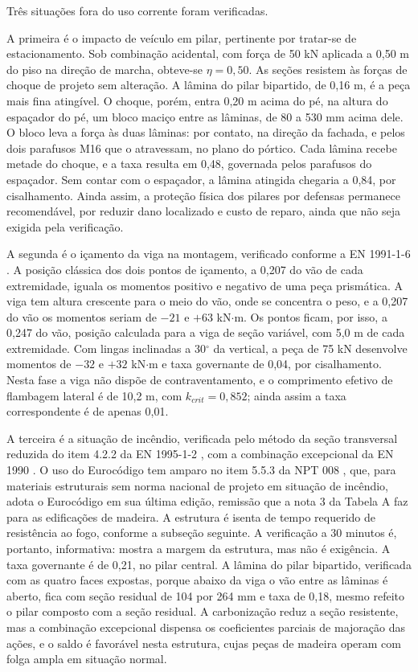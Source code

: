 Três situações fora do uso corrente foram verificadas.

A primeira é o impacto de veículo em pilar, pertinente por tratar-se de
estacionamento. Sob combinação acidental, com força de 50 kN aplicada a 0,50 m
do piso na direção de marcha, obteve-se $\eta = 0{,}50$. As seções resistem às
forças de choque de projeto sem alteração. A lâmina do pilar bipartido, de
0,16 m, é a peça mais fina atingível. O choque, porém, entra 0,20 m acima do pé,
na altura do espaçador do pé, um bloco maciço entre as lâminas, de 80 a 530 mm acima
dele. O bloco leva a força às duas lâminas: por contato, na direção da fachada, e
pelos dois parafusos M16 que o atravessam, no plano do pórtico. Cada lâmina
recebe metade do choque, e a taxa resulta em 0,48, governada pelos parafusos do
espaçador. Sem contar com o espaçador, a lâmina atingida chegaria a 0,84, por
cisalhamento. Ainda assim, a proteção física dos
pilares por defensas permanece recomendável, por reduzir dano localizado e custo
de reparo, ainda que não seja exigida pela verificação.

A segunda é o içamento da viga na montagem, verificado conforme a
EN 1991-1-6 \cite{EN1991-1-6:2005}. A posição clássica dos dois
pontos de içamento, a 0,207 do vão de cada extremidade, iguala os momentos
positivo e negativo de uma peça prismática. A viga tem altura crescente para o
meio do vão, onde se concentra o peso, e a 0,207 do vão os momentos seriam de
$-21$ e $+63$ kN$\cdot$m. Os pontos ficam, por isso, a 0,247 do vão, posição
calculada para a viga de seção variável, com 5,0 m de cada extremidade. Com
lingas inclinadas a 30$^{\circ}$ da vertical, a peça de 75 kN desenvolve momentos
de $-32$ e $+32$ kN$\cdot$m e taxa governante de 0,04, por cisalhamento. Nesta fase
a viga não dispõe de contraventamento, e o comprimento efetivo de flambagem
lateral é de 10,2 m, com $k_{crit} = 0{,}852$; ainda assim a taxa correspondente é
de apenas 0,01.

A terceira é a situação de incêndio, verificada pelo método da seção
transversal reduzida do item 4.2.2 da EN 1995-1-2 \cite{EN1995-1-2:2004}, com a
combinação excepcional da EN 1990 \cite{EN1990:2002}. O uso do Eurocódigo tem
amparo no item 5.5.3 da NPT 008 \cite{CBMPR-NPT008:2026}, que, para materiais
estruturais sem norma nacional de projeto em situação de incêndio, adota o
Eurocódigo em sua última edição, remissão que a nota 3 da Tabela A faz para as
edificações de madeira. A estrutura é isenta de
tempo requerido de resistência ao fogo, conforme a subseção seguinte. A
verificação a 30 minutos é, portanto, informativa: mostra a margem da estrutura,
mas não é exigência. A taxa governante é de 0,21, no pilar central. A lâmina do
pilar bipartido, verificada com as quatro faces expostas, porque abaixo da viga o
vão entre as lâminas é aberto, fica com seção residual de 104 por 264 mm e taxa de
0,18, mesmo refeito o pilar composto com a seção residual. A
carbonização reduz a seção resistente, mas a combinação excepcional dispensa os
coeficientes parciais de majoração das ações, e o saldo é favorável nesta
estrutura, cujas peças de madeira operam com folga ampla em situação normal.

